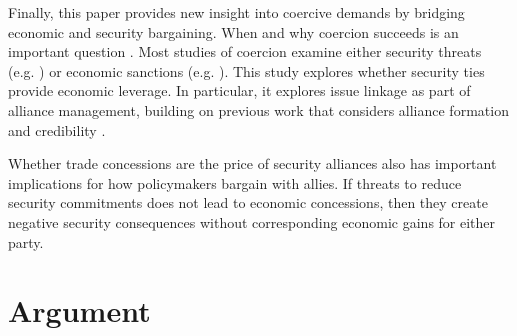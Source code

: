 \documentclass[12pt]{article}
\begin{document}
Finally, this paper provides new insight into coercive demands by bridging economic and security bargaining.
When and why coercion succeeds is an important question \citep{Sechser2010, Sechser2018, Cebuletal2021}.  
Most studies of coercion examine either security threats (e.g. \citep{HorowitzReiter2001, Sechser2011}) or economic sanctions (e.g. \citep{Marinov2005, Allen2008, Escriba-FolchWright2010}).
This study explores whether security ties provide economic leverage. 
In particular, it explores issue linkage as part of alliance management, building on previous work that considers alliance formation \citep{Poast2012} and credibility \citep{Davis2008, Poast2013}. 


Whether trade concessions are the price of security alliances also has important implications for how policymakers bargain with allies. 
If threats to reduce security commitments does not lead to economic concessions, then they create negative security consequences without corresponding economic gains for either party. 


\section{Argument}


%
%
%
\end{document}
